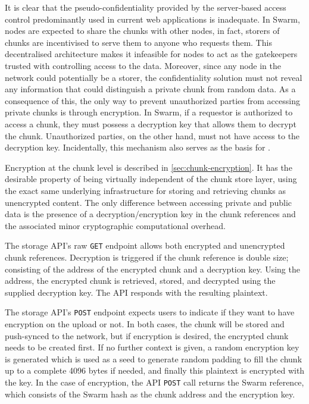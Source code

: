 It is clear that the pseudo-confidentiality provided by the server-based access control predominantly used in current web applications is inadequate. In Swarm, nodes are expected to share the chunks with other nodes, in fact, storers of chunks are incentivised to serve them to anyone who requests them. This decentralised architecture makes it infeasible for nodes to act as the gatekeepers trusted with controlling access to the data. Moreover, since any node in the network could potentially be a storer, the confidentiality solution must not reveal any information that could distinguish a private chunk from random data. As a consequence of this, the only way to prevent unauthorized parties from accessing private chunks is through encryption. In Swarm, if a requestor is authorized to access a chunk, they must possess a decryption key that allows them to decrypt the chunk. Unauthorized parties, on the other hand, must not have access to the decryption key. Incidentally, this mechanism also serves as the basis for .

Encryption at the chunk level is described in \ref{sec:chunk-encryption}. It 
has the desirable property of being virtually independent of the chunk store layer, using the exact same underlying infrastructure for storing and retrieving chunks as unencrypted content.
The only difference between accessing private and public data is the presence of a decryption/encryption key in the chunk references and the associated minor cryptographic computational overhead.


The storage API's raw \lstinline{GET} endpoint allows both encrypted and unencrypted chunk references. 
Decryption is triggered if the chunk reference is double size; consisting of the address of the encrypted chunk and a decryption key. Using the address, the encrypted chunk is retrieved, stored, and decrypted using the supplied decryption key. The API responds with the resulting plaintext.

The storage API's \lstinline{POST} endpoint expects users to indicate if they want to have encryption on the upload or not. In both cases, the chunk will be stored and push-synced to the network, but if encryption is desired, the encrypted chunk needs to be created first. If no further context is given, a random encryption key is generated which is used as a seed to generate random padding to fill the chunk up to a complete 4096 bytes if needed, and finally this plaintext is encrypted with the key. In the case of encryption, the API \lstinline{POST} call returns the Swarm reference, which consists of the Swarm hash as the chunk address and the encryption key. 

